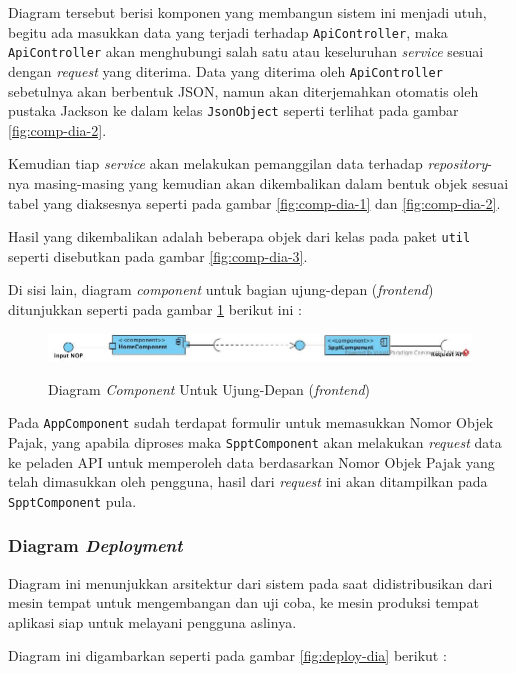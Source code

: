 \documentclass[pdftex,12pt, oneside]{article}
\begin{document}
Diagram tersebut berisi komponen yang membangun sistem ini menjadi utuh, begitu ada masukkan data yang terjadi terhadap \texttt{ApiController}, maka \texttt{ApiController} akan menghubungi salah satu atau keseluruhan \textit{service} sesuai dengan \textit{request} yang diterima. Data yang diterima oleh \texttt{ApiController} sebetulnya akan berbentuk JSON, namun akan diterjemahkan otomatis oleh pustaka Jackson ke dalam kelas \texttt{JsonObject} seperti terlihat pada gambar \ref{fig:comp-dia-2}.

Kemudian tiap \textit{service} akan melakukan pemanggilan data terhadap \textit{repository}-nya masing-masing yang kemudian akan dikembalikan dalam bentuk objek sesuai tabel yang diaksesnya seperti pada gambar \ref{fig:comp-dia-1} dan \ref{fig:comp-dia-2}.

Hasil yang dikembalikan adalah beberapa objek dari kelas pada paket \texttt{util} seperti disebutkan pada gambar \ref{fig:comp-dia-3}.

Di sisi lain, diagram \textit{component} untuk bagian ujung-depan (\textit{frontend}) ditunjukkan seperti pada gambar \ref{fig:comp-dia-fe} berikut ini :

\begin{figure}[H]
	\centering
	\includegraphics[width=1\textwidth]{./resources/component-diagram-fe}
	\label{fig:comp-dia-fe}
	\caption{Diagram \textit{Component} Untuk Ujung-Depan (\textit{frontend})}
\end{figure}

Pada \texttt{AppComponent} sudah terdapat formulir untuk memasukkan Nomor Objek Pajak, yang apabila diproses maka \texttt{SpptComponent} akan melakukan \textit{request} data ke peladen API untuk memperoleh data berdasarkan Nomor Objek Pajak yang telah dimasukkan oleh pengguna, hasil dari \textit{request} ini akan ditampilkan pada \texttt{SpptComponent} pula.

\subsubsection{Diagram \textit{Deployment}}

Diagram ini menunjukkan arsitektur dari sistem pada saat didistribusikan dari mesin tempat untuk mengembangan dan uji coba, ke mesin produksi tempat aplikasi siap untuk melayani pengguna aslinya.

Diagram ini digambarkan seperti pada gambar \ref{fig:deploy-dia} berikut :
\end{document}

